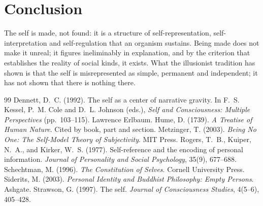 \documentclass{situationist-preprint}
\begin{document}
\section{Conclusion}

The self is made, not found: it is a structure of self-representation, self-interpretation and self-regulation that an organism sustains. Being made does not make it unreal; it figures ineliminably in explanation, and by the criterion that establishes the reality of social kinds, it exists. What the illusionist tradition has shown is that the self is misrepresented as simple, permanent and independent; it has not shown that there is nothing there.

\begin{thebibliography}{99}\small
{} Dennett, D.~C. (1992). The self as a center of narrative gravity. In F.~S. Kessel, P.~M. Cole and D.~L. Johnson (eds.), \emph{Self and Consciousness: Multiple Perspectives} (pp.~103--115). Lawrence Erlbaum.
 Hume, D. (1739). \emph{A Treatise of Human Nature}. Cited by book, part and section.
 Metzinger, T. (2003). \emph{Being No One: The Self-Model Theory of Subjectivity}. MIT Press.
 Rogers, T.~B., Kuiper, N.~A., and Kirker, W.~S. (1977). Self-reference and the encoding of personal information. \emph{Journal of Personality and Social Psychology}, 35(9), 677--688.
 Schechtman, M. (1996). \emph{The Constitution of Selves}. Cornell University Press.
 Siderits, M. (2003). \emph{Personal Identity and Buddhist Philosophy: Empty Persons}. Ashgate.
 Strawson, G. (1997). The self. \emph{Journal of Consciousness Studies}, 4(5--6), 405--428.
\end{thebibliography}
\end{document}
